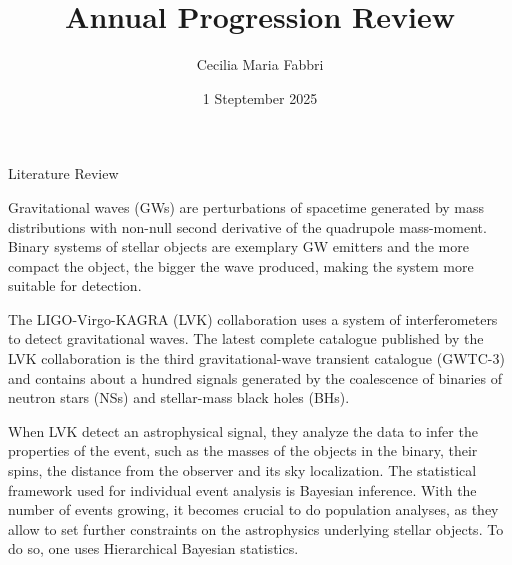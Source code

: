\documentclass[a4paper, 12pt, twoside, openright, titlepage]{book}
\title{Annual Progression Review}
\author{Cecilia Maria Fabbri}
\date{1 Steptember 2025}
\begin{document}


\maketitle



\frontmatter

\tableofcontents




\begin{chapter}{Literature Review}

Gravitational waves (GWs) are perturbations of spacetime generated by mass distributions with non-null second derivative of the quadrupole mass-moment.
Binary systems of stellar objects are exemplary GW emitters
and the more compact the object, the bigger
the wave produced, making the system more suitable for detection. 

The LIGO-Virgo-KAGRA (LVK) collaboration uses a system of interferometers to detect gravitational waves.
The latest complete catalogue published by the LVK collaboration is the third gravitational-wave transient catalogue (GWTC-3) and contains about a hundred signals generated by the coalescence of binaries of neutron stars (NSs) and stellar-mass black holes (BHs).

When LVK detect an astrophysical signal, they analyze the data to infer the properties of the event, such as the masses of the objects in the binary, their spins, the distance from the observer and its sky localization.
The statistical framework used for individual event analysis is Bayesian inference.
With the number of events growing, it becomes crucial to do population analyses, as they allow to set further constraints on the astrophysics underlying stellar objects.
To do so, one uses Hierarchical Bayesian statistics.


\end{chapter}
\end{document}
